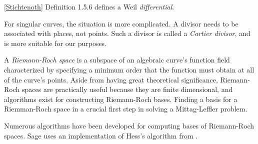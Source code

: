 \ref{Stichtenoth} Definition 1.5.6 defines a Weil {\it differential}.

For singular curves, the situation is more complicated.  A divisor
needs to be associated with places, not points.  Such a divisor is
called a {\it Cartier divisor}, and is more suitable for our purposes.

\vfill\eject
{}

A {\it Riemann-Roch space} is a subspace of an algebraic curve's
function field characterized by specifying a minimum order that the
function must obtain at all of the curve's points.  Aside from having
great theoretical significance, Riemann-Roch spaces are practically
useful because they are finite dimensional, and algorithms exist for
constructing Riemann-Roch bases.  Finding a basis for a Riemman-Roch
space in a crucial first step in solving a Mittag-Leffler problem.

Numerous algorithms have been developed for computing bases of
Riemann-Roch spaces.  Sage uses an implementation of Hess's algorithm
from \cite{hess}.

